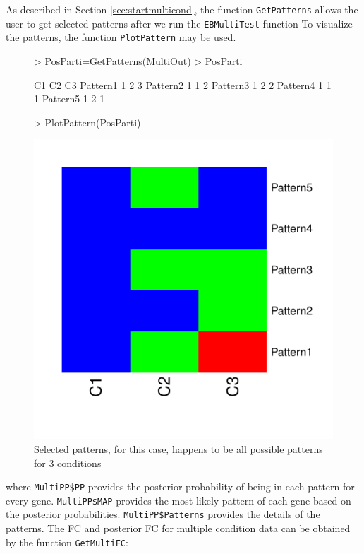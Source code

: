 \documentclass{article}
\begin{document}
As described in Section \ref{sec:startmulticond}, 
the function \verb+GetPatterns+ allows the user to get selected patterns after we run the \verb+EBMultiTest+ function
To visualize the patterns, the function \verb+PlotPattern+ may be used.

\begin{figure}[h!]
\centering
\begin{Schunk}
\begin{Sinput}
> PosParti=GetPatterns(MultiOut)
> PosParti
\end{Sinput}
\begin{Soutput}
         C1 C2 C3
Pattern1  1  2  3
Pattern2  1  1  2
Pattern3  1  2  2
Pattern4  1  1  1
Pattern5  1  2  1
\end{Soutput}
\begin{Sinput}
> PlotPattern(PosParti)
\end{Sinput}
\end{Schunk}
\includegraphics{EBSeq_Vignette-038}
\caption{ Selected patterns, for this case, happens to be all possible patterns for 3 conditions}
\label{fig:Patterns}
\end{figure}
\newpage
\noindent where \verb+MultiPP$PP+ provides the posterior probability of being in each pattern for every gene. 
\verb+MultiPP$MAP+ provides the most likely pattern of each gene based on the posterior 
probabilities. \verb+MultiPP$Patterns+ provides the details of the patterns.  The FC and posterior FC for multiple condition data can
be obtained by the function \verb+GetMultiFC+:
\end{document}
